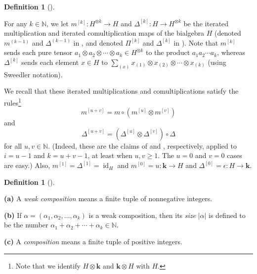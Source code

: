 \documentclass[numbers=enddot,12pt,final,onecolumn,notitlepage]{scrartcl}%
\theoremstyle{definition}
\newtheorem{defi}[theo]{Definition}
\newenvironment{definition}[1][]
{\begin{defi}[#1]\begin{leftbar}}
{\end{leftbar}\end{defi}}
\let\sumnonlimits\sum
\renewcommand{\sum}{\sumnonlimits\limits}
\begin{document}
\begin{definition}
\label{def.iterated}For any $k\in\mathbb{N}$, we let $m^{\left[  k\right]
}:H^{\otimes k}\rightarrow H$ and $\Delta^{\left[  k\right]  }:H\rightarrow
H^{\otimes k}$ be the iterated multiplication and iterated comultiplication
maps of the bialgebra $H$ (denoted $m^{\left(  k-1\right)  }$ and
$\Delta^{\left(  k-1\right)  }$ in \cite[Exercises 1.4.19 and 1.4.20]{GriRei},
and denoted $\Pi^{\left[  k\right]  }$ and $\Delta^{\left[  k\right]  }$ in
\cite{Patras94}). Note that $m^{\left[  k\right]  }$ sends each pure tensor
$a_{1}\otimes a_{2}\otimes\cdots\otimes a_{k}\in H^{\otimes k}$ to the product
$a_{1}a_{2}\cdots a_{k}$, whereas $\Delta^{\left[  k\right]  }$ sends each
element $x\in H$ to $\sum_{\left(  x\right)  }x_{\left(  1\right)  }\otimes
x_{\left(  2\right)  }\otimes\cdots\otimes x_{\left(  k\right)  }$ (using
Sweedler notation).
\end{definition}

We recall that these iterated multiplications and comultiplications satisfy
the rules\footnote{Note that we identify $H\otimes\mathbf{k}$ and
$\mathbf{k}\otimes H$ with $H$.}%
\begin{equation}
m^{\left[  u+v\right]  }=m\circ\left(  m^{\left[  u\right]  }\otimes
m^{\left[  v\right]  }\right)  \label{eq.mu+v}%
\end{equation}
and%
\begin{equation}
\Delta^{\left[  u+v\right]  }=\left(  \Delta^{\left[  u\right]  }\otimes
\Delta^{\left[  v\right]  }\right)  \circ\Delta\label{eq.Du+v}%
\end{equation}
for all $u,v\in\mathbb{N}$. (Indeed, these are the claims of \cite[Exercise
1.4.19(a)]{GriRei} and \cite[Exercise 1.4.20(a)]{GriRei}, respectively,
applied to $i=u-1$ and $k=u+v-1$, at least when $u,v\geq1$. The $u=0$ and
$v=0$ cases are easy.) Also, $m^{\left[  1\right]  }=\Delta^{\left[  1\right]
}=\operatorname*{id}\nolimits_{H}$ and $m^{\left[  0\right]  }=u:\mathbf{k}%
\rightarrow H$ and $\Delta^{\left[  0\right]  }=\epsilon:H\rightarrow
\mathbf{k}$.

\begin{definition}
\label{def.wc}\textbf{(a)} A \emph{weak composition} means a finite tuple of
nonnegative integers. \medskip

\textbf{(b)} If $\alpha=\left(  \alpha_{1},\alpha_{2},\ldots,\alpha
_{k}\right)  $ is a weak composition, then its \emph{size} $\left\vert
\alpha\right\vert $ is defined to be the number $\alpha_{1}+\alpha_{2}%
+\cdots+\alpha_{k}\in\mathbb{N}$. \medskip

\textbf{(c)} A \emph{composition} means a finite tuple of positive integers.
\end{definition}
\end{document}
